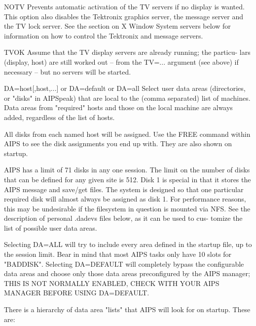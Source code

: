        NOTV    Prevents automatic activation of the  TV  servers  if  no  display  is
               wanted.   This option also disables the Tektronix graphics server, the
               message server and the TV lock server.  See the section  on  X  Window
               System  servers  below for information on how to control the Tektronix
               and message servers.

       TVOK    Assume that the TV display servers are already running;  the  particu-
               lars  (display, host) are still worked out -- from the TV=... argument
               (see above) if necessary -- but no servers will be started.

       DA=host[,host,...] or DA=default or DA=all
               Select user data areas (directories, or "disks" in AIPSpeak) that  are
               local  to  the  (comma  separated)  list of machines.  Data areas from
               "required" hosts and those on the  local  machine  are  always  added,
               regardless of the list of hosts.

               All disks from each named host will be assigned.  Use the FREE command
               within AIPS to see the disk assignments you end  up  with.   They  are
               also shown on startup.

               AIPS  has  a  limit  of 71 disks in any one session.  The limit on the
               number of disks that can be defined for any given site is 512.  Disk 1
               is special in that it stores the AIPS message and save/get files.  The
               system is designed so that one particular required  disk  will  almost
               always  be  assigned  as disk 1.  For performance reasons, this may be
               undesirable if the filesystem in question is mounted via NFS.  See the
               description of personal .dadevs files below, as it can be used to cus-
               tomize the list of possible user data areas.

               Selecting DA=ALL will try to include every area defined in the startup
               file, up to the session limit.  Bear in mind that most AIPS tasks only
               have 10 slots for  "BADDISK".   Selecting  DA=DEFAULT  will completely
               bypass the configurable data areas  and  choose only  those data areas
               preconfigured by the AIPS manager; THIS IS NOT NORMALLY ENABLED, CHECK
               WITH YOUR AIPS MANAGER BEFORE USING DA=DEFAULT.

               There  is  a hierarchy of data area "lists" that AIPS will look for on
               startup.  These are:

